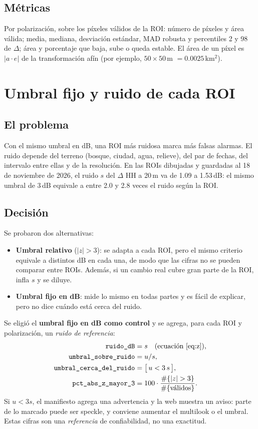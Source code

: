 \documentclass[11pt,a4paper]{article}
\begin{document}
\subsection{Métricas}

Por polarización, sobre los píxeles válidos de la ROI: número de píxeles y área válida; media,
mediana, desviación estándar, MAD robusta y percentiles 2 y 98 de $\Delta$; área y porcentaje que
baja, sube o queda estable. El área de un píxel es $|a\cdot e|$ de la transformación afín (por
ejemplo, $50\times 50$\,m $= 0.0025$\,km$^2$).

\section{Umbral fijo y ruido de cada ROI}
\label{sec:ruido}

\subsection{El problema}

Con el mismo umbral en dB, una ROI más ruidosa marca más falsas alarmas. El ruido depende del
terreno (bosque, ciudad, agua, relieve), del par de fechas, del intervalo entre ellas y de la
resolución. En las ROIs dibujadas y guardadas al 18 de noviembre de 2026, el ruido $s$ del $\Delta$ HH
a 20\,m va de 1.09 a 1.53\,dB: el mismo umbral de 3\,dB equivale a entre 2.0 y 2.8 veces el ruido
según la ROI.

\subsection{Decisión}

Se probaron dos alternativas:
\begin{itemize}
  \item \textbf{Umbral relativo} ($|z|>3$): se adapta a cada ROI, pero el mismo criterio equivale a
        distintos dB en cada una, de modo que las cifras no se pueden comparar entre ROIs. Además, si
        un cambio real cubre gran parte de la ROI, infla $s$ y se diluye.
  \item \textbf{Umbral fijo en dB}: mide lo mismo en todas partes y es fácil de explicar, pero no
        dice cuándo está cerca del ruido.
\end{itemize}
Se eligió el \textbf{umbral fijo en dB como control} y se agrega, para cada ROI y polarización, un
\emph{ruido de referencia}:
\begin{align}
  \texttt{ruido\_dB} &= s \quad\text{(ecuación~\ref{eq:z})},\\
  \texttt{umbral\_sobre\_ruido} &= u / s,\\
  \texttt{umbral\_cerca\_del\_ruido} &= \bigl[\, u < 3\,s \,\bigr],\\
  \texttt{pct\_abs\_z\_mayor\_3} &= 100 \cdot \frac{\#\{|z|>3\}}{\#\{\text{válidos}\}}.
\end{align}
Si $u < 3s$, el manifiesto agrega una advertencia y la web muestra un aviso: parte de lo marcado
puede ser speckle, y conviene aumentar el multilook o el umbral. Estas cifras son una
\emph{referencia} de confiabilidad, no una exactitud.
\end{document}
